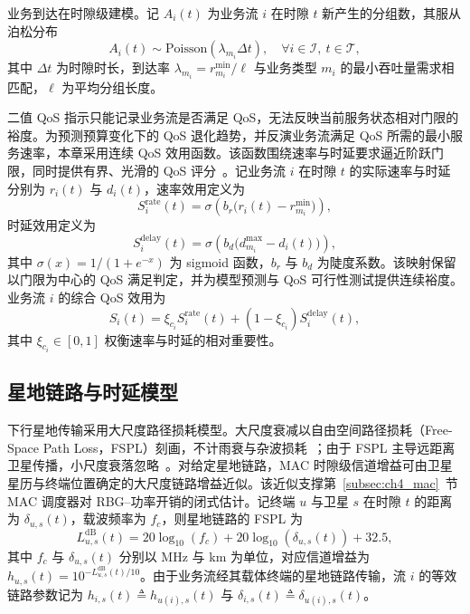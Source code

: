 业务到达在时隙级建模。记 $A_i(t)$ 为业务流 $i$ 在时隙 $t$ 新产生的分组数，其服从泊松分布~\cite{zhao-DualLayerLEO-TVT25}
\begin{equation}\label{eq:ch4_arrival}
A_i(t)\sim\mathrm{Poisson}(\lambda_{m_i}\Delta t),\quad \forall i\in\mathcal I,\ t\in\mathcal T,
\end{equation}
其中 $\Delta t$ 为时隙时长，到达率 $\lambda_{m_i}=r_{m_i}^{\min}/\ell$ 与业务类型 $m_i$ 的最小吞吐量需求相匹配，$\ell$ 为平均分组长度。

二值 QoS 指示只能记录业务流是否满足 QoS，无法反映当前服务状态相对门限的裕度。为预测预算变化下的 QoS 退化趋势，并反演业务流满足 QoS 所需的最小服务速率，本章采用连续 QoS 效用函数。该函数围绕速率与时延要求逼近阶跃门限，同时提供有界、光滑的 QoS 评分~\cite{sun-ResourceSlicing-systemJournal20}。记业务流 $i$ 在时隙 $t$ 的实际速率与时延分别为 $r_i(t)$ 与 $d_i(t)$，速率效用定义为
\begin{equation}\label{eq:ch4_rateutil}
S_i^\text{rate}(t)=\sigma\!\left(b_r\big(r_i(t)-r_{m_i}^{\min}\big)\right),
\end{equation}
时延效用定义为
\begin{equation}\label{eq:ch4_delayutil}
S_i^\text{delay}(t)=\sigma\!\left(b_d\big(d_{m_i}^{\max}-d_i(t)\big)\right),
\end{equation}
其中 $\sigma(x)=1/(1+e^{-x})$ 为 sigmoid 函数，$b_r$ 与 $b_d$ 为陡度系数。该映射保留以门限为中心的 QoS 满足判定，并为模型预测与 QoS 可行性测试提供连续裕度。业务流 $i$ 的综合 QoS 效用为
\begin{equation}\label{eq:ch4_qosutil}
S_i(t)=\xi_{c_i}S_i^\text{rate}(t)+(1-\xi_{c_i})S_i^\text{delay}(t),
\end{equation}
其中 $\xi_{c_i}\in[0,1]$ 权衡速率与时延的相对重要性。

\subsection{星地链路与时延模型}
\label{subsec:ch4_link}

下行星地传输采用大尺度路径损耗模型。大尺度衰减以自由空间路径损耗（Free-Space Path Loss，FSPL）刻画，不计雨衰与杂波损耗~\cite{zhang-SAGINChannelModel-TVT25}；由于 FSPL 主导远距离卫星传播，小尺度衰落忽略~\cite{Dwivedi-LEOSatIoTInterference-IoTJ24}。对给定星地链路，MAC 时隙级信道增益可由卫星星历与终端位置确定的大尺度链路增益近似。该近似支撑第~\ref{subsec:ch4_mac}~节 MAC 调度器对 RBG--功率开销的闭式估计。记终端 $u$ 与卫星 $s$ 在时隙 $t$ 的距离为 $\delta_{u,s}(t)$，载波频率为 $f_c$，则星地链路的 FSPL 为
\begin{equation}\label{eq:ch4_fspl}
L_{u,s}^\text{dB}(t)=20\log_{10}(f_c)+20\log_{10}(\delta_{u,s}(t))+32.5,
\end{equation}
其中 $f_c$ 与 $\delta_{u,s}(t)$ 分别以 MHz 与 km 为单位，对应信道增益为 $h_{u,s}(t)=10^{-L_{u,s}^\text{dB}(t)/10}$。由于业务流经其载体终端的星地链路传输，流 $i$ 的等效链路参数记为 $h_{i,s}(t)\triangleq h_{u(i),s}(t)$ 与 $\delta_{i,s}(t)\triangleq\delta_{u(i),s}(t)$。

